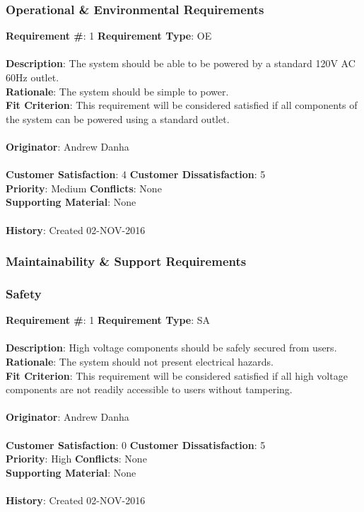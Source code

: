 \documentclass[titlepage]{article}
\begin{document}
\subsubsection{Operational \& Environmental Requirements}
\begin{framed}
	\noindent\textbf{Requirement \#}: 1 \hfill \textbf{Requirement Type}: OE \hfill\\\\
	\noindent\textbf{Description}: The system should be able to be powered by a standard 120V AC 60Hz outlet.\\
	\textbf{Rationale}: The system should be simple to power.\\
	\textbf{Fit Criterion}: This requirement will be considered satisfied if all components of the system can be powered using a standard outlet.\\\\
	\textbf{Originator}: Andrew Danha\\\\
	\noindent\textbf{Customer Satisfaction}: 4 \hfill 	\textbf{Customer Dissatisfaction}: 5 \hfill\\
	\textbf{Priority}: Medium \hfill \textbf{Conflicts}: None \hfill\\
	\textbf{Supporting Material}: None\\\\
	\noindent\textbf{History}: Created 02-NOV-2016
\end{framed}

\subsubsection{Maintainability \& Support Requirements}%

\subsubsection{Safety}
\begin{framed}
	\noindent\textbf{Requirement \#}: 1 \hfill \textbf{Requirement Type}: SA \hfill\\\\
	\noindent\textbf{Description}: High voltage components should be safely secured from users.\\
	\textbf{Rationale}: The system should not present electrical hazards.\\
	\textbf{Fit Criterion}: This requirement will be considered satisfied if all high voltage components are not readily accessible to users without tampering.\\\\
	\textbf{Originator}: Andrew Danha\\\\
	\noindent\textbf{Customer Satisfaction}: 0 \hfill 	\textbf{Customer Dissatisfaction}: 5 \hfill\\
	\textbf{Priority}: High \hfill \textbf{Conflicts}: None \hfill\\
	\textbf{Supporting Material}: None\\\\
	\noindent\textbf{History}: Created 02-NOV-2016
\end{framed}
\end{document}
